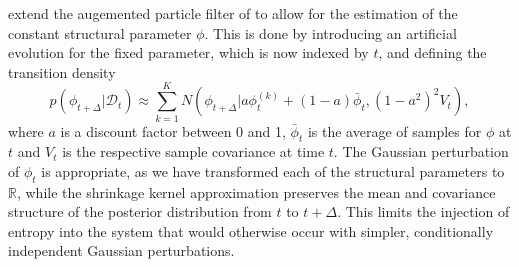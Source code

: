 \documentclass[10pt]{article}
\begin{document}
\cite{liu2001combined} extend the augemented particle filter of
\cite{pitt1999filtering} to allow for the estimation of the constant
structural parameter $\phi$. This is done by introducing an artificial
evolution for the fixed parameter, which is now indexed by $t$, and
defining the transition density
\[
  p(\phi_{t+\Delta} | \mathcal{D}_t) \approx \sum_{k=1}^K
  N(\phi_{t+\Delta} | a\phi_t^{(k)} + (1-a)\bar{\phi}_t, (1-a^2)^2 V_t),
\]
where $a$ is a discount factor between 0 and 1, $\bar{\phi}_t$ is the
average of samples for $\phi$ at $t$ and $V_t$ is the respective
sample covariance at time $t$. The Gaussian perturbation of $\phi_t$
is appropriate, as we have transformed each of the structural
parameters to $\mathbb{R}$, while the shrinkage kernel approximation
preserves the mean and covariance structure of the posterior
distribution from $t$ to $t+\Delta$. This limits the injection of
entropy into the system that would otherwise occur with simpler,
conditionally independent Gaussian perturbations.
\end{document}
